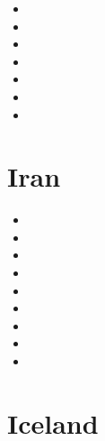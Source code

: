 \begin{scriptsize}
\begin{itemize}
\item[\nineteeneighty] 
\item[\twothousandfive]
\item[\twothousandeight]
\item[\twothousandthirteen]
\item[\twothousandfourteen] 
\item[\twothousandfifteen] 
\item[\twothousand]
\end{itemize}
\end{scriptsize}

\section{Iran}

\begin{scriptsize}
\begin{itemize}
\item[\twothousandthree] 
\item[\twothousandsix] 
\item[\twothousandten] 
\item[\twothousandeleven] 
\item[\twothousandthirteen] 
\item[\twothousandfourteen] 
\item[\twothousandsixteen] 
\item[\twothousandtwenty] 
\item[\twothousandtwentythree] 
\end{itemize}
\end{scriptsize} 
 
\section{Iceland}

